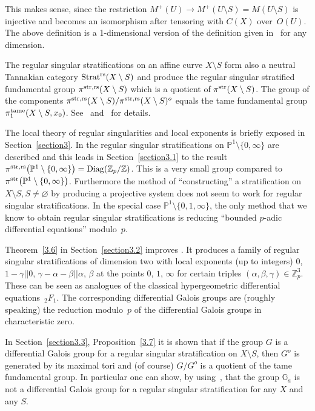 \documentclass[10pt,a4paper]{amsart}
\numberwithin{equation}{section}
\begin{document}
This makes sense, since the restriction $M^+(U)\rightarrow M^+(U\setminus S)=M(U\setminus S)$ is injective and becomes an isomorphism after tensoring with $C(X)$ over~$O(U)$.
 The above definition is a 1-dimensional version of the definition given in~\cite{Gie} for any dimension.

The regular singular stratifications on an affine curve $X\setminus S$ form also a neutral Tannakian ca\-tegory $\operatorname{Strat}^{\rm rs}(X\setminus S)$ and produce the regular singular stratified fundamental group \mbox{$\pi^{\rm str,rs}(X\setminus S)$} which is a quotient of $\pi^{\rm str}(X\setminus S)$. The group of the components
$\pi^{\rm str,rs}(X\setminus S)/\pi^{\rm str,rs}(X\setminus S)^o$ equals the tame fundamental group $\pi_1^{\rm tame}(X\setminus S,x_0)$. See~\cite{K} and~\cite{Ki} for details.

The local theory of regular singularities and local exponents is briefly exposed in Section~\ref{section3}. In \cite{Gie} the regular singular stratifications on $\mathbb{P}^1\setminus \{0,\infty \}$ are described and this leads in Section~\ref{section3.1} to the result $\pi^{\rm str,rs}\big(\mathbb{P}^1\setminus \{0,\infty\}\big)=\operatorname{Diag}(\mathbb{Z}_p/\mathbb{Z})$. This is a very small group compared to $\pi^{\rm str}\big(\mathbb{P}^1\setminus \{0,\infty\}\big)$. Furthermore the method of ``constructing'' a stratification on $X\setminus S, S\neq \varnothing$ by producing a projective system does not seem to work for regular singular stratifications.
In the special case $\mathbb{P}^1\setminus \{0,1,\infty\}$, the only method that we know to obtain regular singular stratifications is reducing ``bounded $p$-adic differential equations'' modulo~$p$.

 Theorem~\ref{3.6} in Section~\ref{section3.2} improves \cite[Theorem~8.9]{Ma-vdP1}. It produces a family of regular singular stratifications of dimension two with local exponents (up to integers) $0$, $1-\gamma || 0$, $\gamma -\alpha -\beta || \alpha$, $\beta$ at the points $0$, $1$, $\infty$ for certain triples $(\alpha , \beta , \gamma) \in \mathbb{Z}_p^3$. These can be seen as analogues of the classical hypergeometric differential equations~$_2F_1$. The corresponding differential Galois groups are (roughly speaking) the reduction modulo~$p$ of the differential Galois groups in characteristic zero.

In Section~\ref{section3.3}, Proposition~\ref{3.7} it is shown that if the group $G$ is a differential Galois group for a regular singular stratification on $X\setminus S$, then $G^o$ is generated by its maximal tori and (of course) $G/G^o$ is a quotient of the tame fundamental group. In particular one can show, by using~\cite[Corollary~16]{Sa}, that the group $\mathbb{G}_a$ is not a differential Galois group for a regular singular stratification for any $X$ and any $S$.
\end{document}
